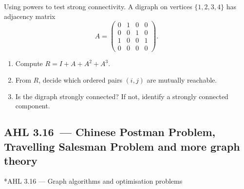 \documentclass[11pt]{article}
\def\textbf#1{#1}%
\newcommand{\tocsubsection}[1]{\subsection{#1}}
\newcounter{question}
\begin{document}
\begin{question}
\textbf{Using powers to test strong connectivity.}
A digraph on vertices \(\{1,2,3,4\}\) has adjacency matrix
\[
A=\begin{pmatrix}
0&1&0&0\\
0&0&1&0\\
1&0&0&1\\
0&0&0&0
\end{pmatrix}.
\]
\begin{enumerate}
  \item Compute \(R=I+A+A^2+A^3\).  
  \item From \(R\), decide which ordered pairs \((i,j)\) are mutually reachable.  
  \item Is the digraph strongly connected? If not, identify a strongly connected component.
\end{enumerate}
\end{question}







\tocsubsection{AHL 3.16 — Chinese Postman Problem, Travelling Salesman Problem and more graph theory}
\textbf*{AHL 3.16 — Graph algorithms and optimisation problems}

\usetikzlibrary{positioning,arrows.meta,calc,fit}
\end{document}
